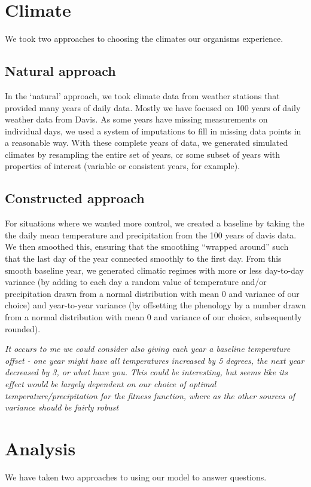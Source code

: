 \documentclass[11pt,a4paper]{article}
\begin{document}
\section{Climate}
We took two approaches to choosing the climates our organisms experience. 
\subsection{Natural approach}\label{sec:climate1}
In the `natural' approach, we took climate data from weather stations that provided many years of daily data. Mostly we have focused on 100 years of daily weather data from Davis. As some years have missing measurements on individual days, we used a system of imputations to fill in missing data points in a reasonable way. With these complete years of data, we generated simulated climates by resampling the entire set of years, or some subset of years with properties of interest (variable or consistent years, for example). 

\subsection{Constructed approach}\label{sec:climate2}
For situations where we wanted more control, we created a baseline by taking the the daily mean temperature and precipitation from the 100 years of davis data. We then smoothed this, ensuring that the smoothing ``wrapped around'' such that the last day of the year connected smoothly to the first day. From this smooth baseline year, we generated climatic regimes with more or less day-to-day variance (by adding to each day a random value of temperature and/or precipitation drawn from a normal distribution with mean 0 and variance of our choice) and year-to-year variance (by offsetting the phenology by a number drawn from a normal distribution with mean 0 and variance of our choice, subsequently rounded). 

\textit{It occurs to me we could consider also giving each year a baseline temperature offset - one year might have all temperatures increased by 5 degrees, the next year decreased by 3, or what have you. This could be interesting, but seems like its effect would be largely dependent on our choice of optimal temperature/precipitation for the fitness function, where as the other sources of variance should be fairly robust}

\section{Analysis}
We have taken two approaches to using our model to answer questions.
\end{document}
